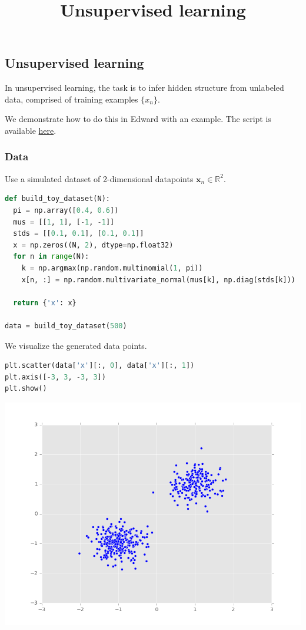 \title{Unsupervised learning}

\subsection{Unsupervised learning}

In unsupervised learning, the task is to infer hidden structure from
unlabeled data, comprised of training examples $\{x_n\}$.

We demonstrate how to do this in Edward with an example.
The script is available
\href{https://github.com/blei-lab/edward/blob/master/examples/mixture_gaussian.py}
{here}.


\subsubsection{Data}

Use a simulated dataset of 2-dimensional datapoints
$\mathbf{x}_n\in\mathbb{R}^2$.
\begin{lstlisting}[language=Python]
def build_toy_dataset(N):
  pi = np.array([0.4, 0.6])
  mus = [[1, 1], [-1, -1]]
  stds = [[0.1, 0.1], [0.1, 0.1]]
  x = np.zeros((N, 2), dtype=np.float32)
  for n in range(N):
    k = np.argmax(np.random.multinomial(1, pi))
    x[n, :] = np.random.multivariate_normal(mus[k], np.diag(stds[k]))

  return {'x': x}

data = build_toy_dataset(500)
\end{lstlisting}

We visualize the generated data points.
\begin{lstlisting}[language=Python]
plt.scatter(data['x'][:, 0], data['x'][:, 1])
plt.axis([-3, 3, -3, 3])
plt.show()
\end{lstlisting}
\includegraphics[width=700px]{images/unsupervised-fig0.png}

